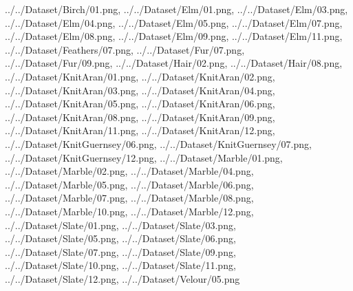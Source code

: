 \documentclass[12pt,a4paper]{article}
\begin{document}
\begin{singlespace}
{../../Dataset/Birch/01.png,
../../Dataset/Elm/01.png,
../../Dataset/Elm/03.png,
../../Dataset/Elm/04.png,
../../Dataset/Elm/05.png,
../../Dataset/Elm/07.png,
../../Dataset/Elm/08.png,
../../Dataset/Elm/09.png,
../../Dataset/Elm/11.png,
../../Dataset/Feathers/07.png,
../../Dataset/Fur/07.png,
../../Dataset/Fur/09.png,
../../Dataset/Hair/02.png,
../../Dataset/Hair/08.png,
../../Dataset/KnitAran/01.png,
../../Dataset/KnitAran/02.png,
../../Dataset/KnitAran/03.png,
../../Dataset/KnitAran/04.png,
../../Dataset/KnitAran/05.png,
../../Dataset/KnitAran/06.png,
../../Dataset/KnitAran/08.png,
../../Dataset/KnitAran/09.png,
../../Dataset/KnitAran/11.png,
../../Dataset/KnitAran/12.png,
../../Dataset/KnitGuernsey/06.png,
../../Dataset/KnitGuernsey/07.png,
../../Dataset/KnitGuernsey/12.png,
../../Dataset/Marble/01.png,
../../Dataset/Marble/02.png,
../../Dataset/Marble/04.png,
../../Dataset/Marble/05.png,
../../Dataset/Marble/06.png,
../../Dataset/Marble/07.png,
../../Dataset/Marble/08.png,
../../Dataset/Marble/10.png,
../../Dataset/Marble/12.png,
../../Dataset/Slate/01.png,
../../Dataset/Slate/03.png,
../../Dataset/Slate/05.png,
../../Dataset/Slate/06.png,
../../Dataset/Slate/07.png,
../../Dataset/Slate/09.png,
../../Dataset/Slate/10.png,
../../Dataset/Slate/11.png,
../../Dataset/Slate/12.png,
../../Dataset/Velour/05.png}


\end{singlespace}
\end{document}
